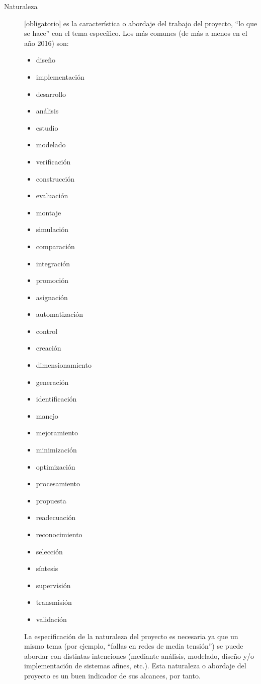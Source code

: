 \begin{description}
\item[Naturaleza] [obligatorio] es la característica o abordaje del trabajo del proyecto, ``lo que se hace'' con el tema específico. Los más comunes (de más a menos en el año 2016) son:
\begin{multicols}{3}
\begin{itemize}
\item diseño
\item implementación
\item desarrollo
\item análisis
\item estudio
\item modelado
\item verificación
\item construcción
\item evaluación
\item montaje
\item simulación
\item comparación
\item integración
\item promoción
\item asignación
\item automatización
\item control
\item creación
\item dimensionamiento
\item generación
\item identificación
\item manejo
\item mejoramiento
\item minimización
\item optimización
\item procesamiento
\item propuesta
\item readecuación
\item reconocimiento
\item selección
\item síntesis
\item supervisión
\item transmisión
\item validación
\end{itemize}
\end{multicols}

La especificación de la naturaleza del proyecto es necesaria ya que un mismo tema (por ejemplo, ``fallas en redes de media tensión'') se puede abordar con distintas intenciones (mediante análisis, modelado, diseño y/o implementación de sistemas afines, etc.). Esta naturaleza o abordaje del proyecto es un buen indicador de sus alcances, por tanto.


\end{description}
